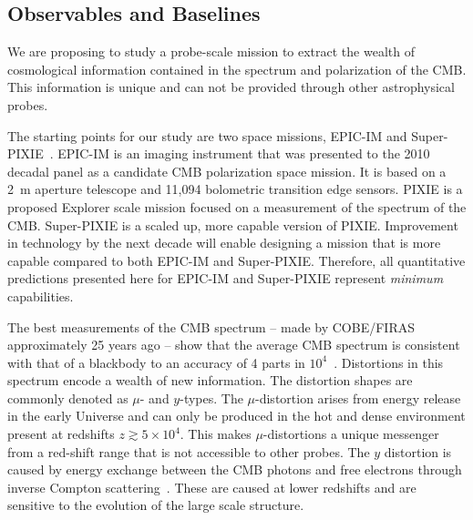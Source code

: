 
\subsection{Observables and Baselines}
\label{sec:observables}

\vspace{-0.05in}

We are proposing to study a probe-scale mission to extract the wealth 
of cosmological information contained in the spectrum and polarization of the \ac{CMB}. This information is unique
and can not be provided through other astrophysical probes.  

The starting points for our study are two space missions, EPIC-IM and Super-PIXIE~\cite{epic_im,pixie}. EPIC-IM is 
an imaging instrument that was presented 
to the 2010 decadal panel as a candidate \ac{CMB} polarization space mission. It is based on a 2~m aperture telescope 
and 11,094 bolometric transition edge sensors. 
PIXIE is a proposed Explorer scale mission focused on a measurement of the spectrum of the CMB. Super-PIXIE is a scaled up, 
more capable version of PIXIE. Improvement in technology by the next decade will enable designing a mission 
that is more capable compared to both EPIC-IM and Super-PIXIE. Therefore, all quantitative predictions presented here
for EPIC-IM and Super-PIXIE represent {\it minimum} capabilities. 

The best measurements of the \ac{CMB} spectrum -- made by COBE/FIRAS approximately 25 years ago --
show that the average CMB spectrum is consistent with that of a blackbody to an accuracy of 4 parts 
in $10^{4}$~\cite{Mather1994, Fixsen1996}. Distortions in this spectrum encode a wealth of new information.
The distortion shapes are commonly denoted as $\mu$- and $y$-types. The 
$\mu$-distortion arises from energy release in the early Universe and can only be produced in the hot and dense 
environment present at redshifts $z\gtrsim 5\times10^4$. This makes $\mu$-distortions a unique messenger from a red-shift 
range that is not accessible to other probes. The $y$ distortion is caused by 
energy exchange between the \ac{CMB} photons and free electrons through inverse Compton 
scattering~\cite{Zeldovich1969, Sunyaev1970mu}. These are caused at lower redshifts and are sensitive to the 
evolution of the large scale structure. 

